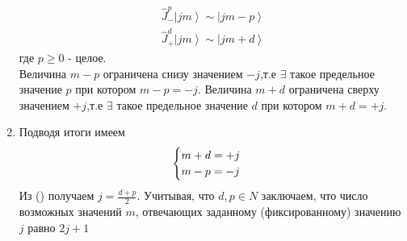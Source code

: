 \documentclass[__main__.tex]{subfiles}
\begin{document}
\begin{enumerate}
          \begin{gather*}
              \hat{J}^p_{-}\left|jm\right> \sim \left|jm-p\right>\\
              \hat{J}^d_{+}\left|jm\right> \sim \left|jm+d\right>
          \end{gather*}
          где $p \geq 0$ - целое.\\
          Величина $m-p$ ограничена снизу значением $-j$,т.е $\exists$ такое предельное значение $p$ при котором $m-p = -j$. Величина $m+d$ ограничена сверху значением $+j$,т.е $\exists$ такое предельное значение $d$ при котором $m+d = +j$.
    \item Подводя итоги имеем
          \begin{equation}
              \llabel{k10-1}
              \begin{cases}
                  m+d = +j \\
                  m-p = -j
              \end{cases}
          \end{equation}
          Из () получаем $j = \frac{d+p}{2}$. Учитывая, что $d,p \in N$ заключаем, что число возможных значений $m$, отвечающих заданному (фиксированному) значению $j$ равно $2j+1$
\end{enumerate}
\end{document}
